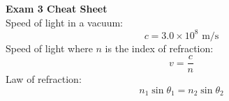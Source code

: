 \documentclass[11pt]{article}
\begin{document}
    \noindent \textbf{Exam 3 Cheat Sheet}%
    \\ \noindent \newline
    Speed of light in a vacuum:
      \begin{equation}
        c  =  3.0 \times 10^8 \text{ m/s} \tag{in a vacuum}
    \end{equation}
    Speed of light where $n$ is the index of refraction:
    \begin{equation}
      v = \frac{c}{n} \tag{speed of light}
    \end{equation}
    Law of refraction:
\begin{equation}
  n_1 \sin \theta_1 = n_2 \sin \theta_2 \tag{Snell's Law}
\end{equation}
\end{document}

